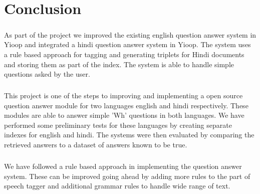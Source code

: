 \chapter{Conclusion}

\paragraph{}
As part of the project we improved the existing english question answer system in Yioop and integrated a hindi question answer system in Yioop. The system uses a rule based approach for tagging and generating triplets for Hindi documents and storing them as part of the index. The system is able to handle simple questions asked by the user.

\paragraph{}
This project is one of the steps to improving and implementing a open source question answer module for two languages english and hindi respectively. These modules are able to answer simple 'Wh' questions in both languages. We have performed some preliminary tests for these languages by creating separate indexes for english and hindi. The systems were then evaluated by comparing the retrieved answers to a dataset of answers known to be true.

\paragraph{}
We have followed a rule based approach in implementing the question answer system. These can be improved going ahead by adding more rules to the part of speech tagger and additional grammar rules to handle wide range of text.